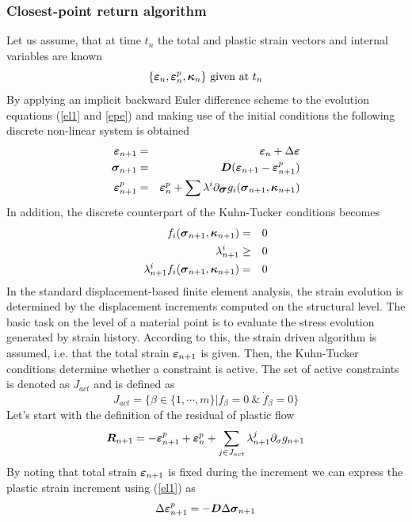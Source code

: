 \documentclass[a4paper]{article}
\newcommand{\mbf}[1]{\mbox{\boldmath$#1$}}
\newcommand{\ep}[0]{\mbf{\varepsilon}^p}
\newcommand{\e}{\mbf{\varepsilon}}
\newcommand{\sig}{\mbf{\sigma}}
\begin{document}
\subsubsection{Closest-point return algorithm}
Let us assume, that at time $t_n$ the total and plastic strain vectors and internal variables are known
$$
\{\mbf{\varepsilon}_n, \mbf{\varepsilon}^p_n, \mbf{\kappa}_n\}\  {\rm given\ at}\ t_n
$$
By applying an implicit backward Euler difference scheme to the evolution equations (\ref{el1} and \ref{epe})
and making use of the initial conditions the following discrete non-linear system is obtained
\begin{eqnarray}
\e_{n+1}&=&\e_n+\Delta\e\\
\label{del}
\sig_{n+1}&=&\mbf{D}(\e_{n+1}-\ep_{n+1})\\
\label{dep}
\ep_{n+1}&=&\ep_{n}+\sum\lambda^i\partial_{\sig} g_i(\sig_{n+1}, \mbf{\kappa}_{n+1})
\end{eqnarray}
In addition, the discrete counterpart of the Kuhn-Tucker conditions becomes
\begin{eqnarray}
\label{dktc}
f_i(\sig_{n+1}, \mbf{\kappa}_{n+1}) &=& 0\\
\lambda^i_{n+1} &\ge& 0\\
\lambda^i_{n+1} f_i(\sig_{n+1}, \mbf{\kappa}_{n+1})&=& 0
\end{eqnarray}
In the standard displacement-based finite element analysis, the strain evolution is determined by the displacement increments computed on the structural level. The basic task on the level of a material point is to evaluate the stress evolution generated by strain history.
According to this, the strain driven algorithm is assumed, i.e. that the total strain $\e_{n+1}$ is given.
Then, the Kuhn-Tucker conditions determine whether a constraint is active. The set of active constraints is denoted as $J_{act}$ and is defined as
\begin{equation}
J_{act}=\{\beta\in\{1,\cdots,m\}|f_\beta=0\ \&\ \dot{f}_\beta=0\}
\end{equation}
Let's start with the definition of the residual of plastic flow
\begin{equation}
\label{rpf}
\mbf{R}_{n+1}=-\ep_{n+1}+\ep_{n}+\sum_{j\in J_{act}}\lambda^j_{n+1}\partial_\sigma g_{n+1}
\end{equation}
By noting that total strain $\e_{n+1}$ is fixed during the increment we can express the plastic strain increment using  (\ref{el1}) as
\begin{equation}
\Delta\ep_{n+1} = -\mbf{D}\Delta\sig_{n+1}
\end{equation}
\end{document}
